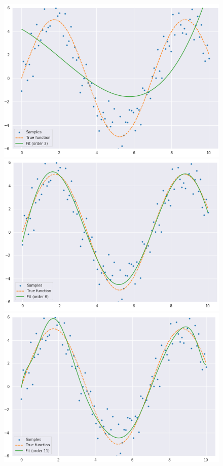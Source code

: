 \documentclass[11pt,a4paper]{article}
\begin{document}
\begin{figure}[H]

 \centering
 \includegraphics[scale=0.35]{../images/fit_nlinear_order3.png}
 \includegraphics[scale=0.35]{../images/fit_nlinear_order6.png} \\
 \includegraphics[scale=0.35]{../images/fit_nlinear_order11.png}

\end{figure}
\end{document}

